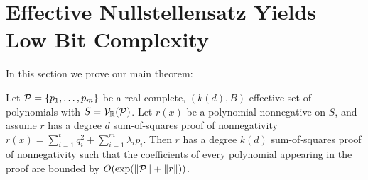 \section{Effective Nullstellensatz Yields Low Bit Complexity}
\label{sec:main}

In this section we prove our main theorem:

\begin{theorem}\label{thm:main}
Let $\mathcal P = \{p_1,\dots,p_m\}$ be a real complete, $(k(d),B)$-effective set of polynomials with $S = \mathcal V_\mathbb R(\mathcal P)$. Let $r(x)$ be a polynomial nonnegative on $S$, and assume $r$ has a degree $d$ sum-of-squares proof of nonnegativity $r(x) = \sum_{i=1}^t q_i^2 + \sum_{i=1}^m \lambda_i p_i$. Then $r$ has a degree $k(d)$ sum-of-squares proof of nonnegativity such that the coefficients of every polynomial appearing in the proof are bounded by $O(\exp(\|\mathcal P\| + \|r\|))$.
\end{theorem}
